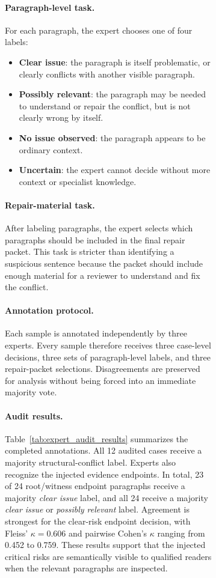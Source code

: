 \documentclass[11pt]{article}
\begin{document}
\begin{figure}[!t]
\begin{figure}[!t]
\paragraph{Paragraph-level task.}
For each paragraph, the expert chooses one of four labels:
\begin{itemize}[leftmargin=*,itemsep=1pt]
    \item \textbf{Clear issue}: the paragraph is itself problematic, or clearly conflicts with another visible paragraph.
    \item \textbf{Possibly relevant}: the paragraph may be needed to understand or repair the conflict, but is not clearly wrong by itself.
    \item \textbf{No issue observed}: the paragraph appears to be ordinary context.
    \item \textbf{Uncertain}: the expert cannot decide without more context or specialist knowledge.
\end{itemize}

\paragraph{Repair-material task.}
After labeling paragraphs, the expert selects which paragraphs should be included in the final repair packet.  This task is stricter than identifying a suspicious sentence because the packet should include enough material for a reviewer to understand and fix the conflict.

\paragraph{Annotation protocol.}
Each sample is annotated independently by three experts.  Every sample therefore receives three case-level decisions, three sets of paragraph-level labels, and three repair-packet selections.  Disagreements are preserved for analysis without being forced into an immediate majority vote.

\paragraph{Audit results.}
Table~\ref{tab:expert_audit_results} summarizes the completed annotations.  All 12 audited cases receive a majority structural-conflict label.  Experts also recognize the injected evidence endpoints.  In total, 23 of 24 root/witness endpoint paragraphs receive a majority \emph{clear issue} label, and all 24 receive a majority \emph{clear issue} or \emph{possibly relevant} label.  Agreement is strongest for the clear-risk endpoint decision, with Fleiss' $\kappa=0.606$ and pairwise Cohen's $\kappa$ ranging from 0.452 to 0.759.  These results support that the injected critical risks are semantically visible to qualified readers when the relevant paragraphs are inspected.


\end{figure}
\end{figure}
\end{document}
